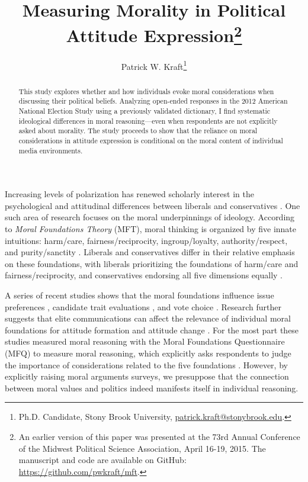 \documentclass[12pt]{article}
\author{Patrick W. Kraft\footnote{Ph.D. Candidate, Stony Brook University, \href{mailto:patrick.kraft@stonybrook.edu}{patrick.kraft@stonybrook.edu}.
}}
\title{Measuring Morality in Political Attitude Expression\footnote{An earlier version of this paper was presented at the 73rd Annual Conference of the Midwest Political Science Association, April 16-19, 2015. The manuscript and code are available on GitHub: \url{https://github.com/pwkraft/mft}.}}
\begin{document}
\maketitle
\doublespacing
\thispagestyle{empty}

\begin{abstract}
This study explores whether and how individuals evoke moral considerations when discussing their political beliefs. Analyzing open-ended responses in the 2012 American National Election Study using a previously validated dictionary, I find systematic ideological differences in moral reasoning---even when respondents are not explicitly asked about morality. The study proceeds to show that the reliance on moral considerations in attitude expression is conditional on the moral content of individual media environments.

\end{abstract}
\newpage
\setcounter{page}{1}

Increasing levels of polarization has renewed scholarly interest in the psychological and attitudinal differences between liberals and conservatives \citep{jost2006end}. One such area of research focuses on the moral underpinnings of ideology. According to \textit{Moral Foundations Theory} (MFT), moral thinking is organized by five innate intuitions: harm/care, fairness/reciprocity, ingroup/loyalty, authority/respect, and purity/sanctity \citep{haidt2012righteous}. Liberals and conservatives differ in their relative emphasis on these foundations, with liberals prioritizing the foundations of harm/care and fairness/reciprocity, and conservatives endorsing all five dimensions equally \citep{graham2009liberals}.


A series of recent studies shows that the moral foundations influence issue preferences \citep{kertzer2014moral}, candidate trait evaluations \citep{clifford2014linking}, and vote choice \citep{iyer2010beyond}. Research further suggests that elite communications can affect the relevance of individual moral foundations for attitude formation and attitude change \citep[e.g.][]{clifford2015concerns,feinberg2013moral}. For the most part these studies measured moral reasoning with the Moral Foundations Questionnaire (MFQ) to measure moral reasoning, which explicitly asks respondents to judge the importance of considerations related to the five foundations \citep[e.g.][]{graham2011mapping}. However, by explicitly raising moral arguments surveys, we presuppose that the connection between moral values and politics indeed manifests itself in individual reasoning.
\end{document}
